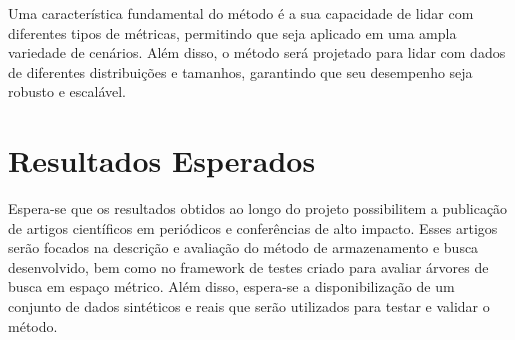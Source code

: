\documentclass[a4paper,12pt,oneside]{article}
\begin{document}
Uma característica fundamental do método é a sua capacidade de lidar com diferentes tipos de métricas, permitindo que seja aplicado em uma ampla variedade de cenários. Além disso, o método será projetado para lidar com dados de diferentes distribuições e tamanhos, garantindo que seu desempenho seja robusto e escalável.

\section{Resultados Esperados}

Espera-se que os resultados obtidos ao longo do projeto possibilitem a publicação de artigos científicos em periódicos e conferências de alto impacto. Esses artigos serão focados na descrição e avaliação do método de armazenamento e busca desenvolvido, bem como no framework de testes criado para avaliar árvores de busca em espaço métrico. Além disso, espera-se a disponibilização de um conjunto de dados sintéticos e reais que serão utilizados para testar e validar o método.



\end{document}
